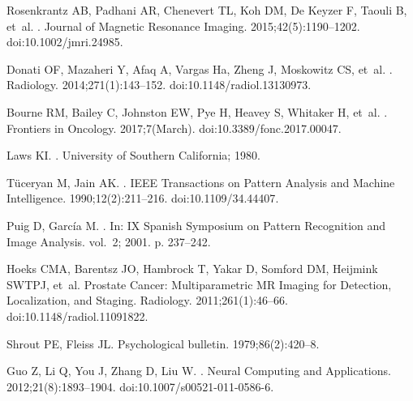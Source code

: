 \documentclass[10pt,letterpaper]{article}
\begin{document}
\begin{thebibliography}{10}
Rosenkrantz AB, Padhani AR, Chenevert TL, Koh DM, {De Keyzer} F, Taouli B,
  et~al.
.
\newblock Journal of Magnetic Resonance Imaging. 2015;42(5):1190--1202.
\newblock doi:{10.1002/jmri.24985}.

Donati OF, Mazaheri Y, Afaq A, Vargas Ha, Zheng J, Moskowitz CS, et~al.
.
\newblock Radiology. 2014;271(1):143--152.
\newblock doi:{10.1148/radiol.13130973}.

Bourne RM, Bailey C, Johnston EW, Pye H, Heavey S, Whitaker H, et~al.
.
\newblock Frontiers in Oncology. 2017;7(March).
\newblock doi:{10.3389/fonc.2017.00047}.

Laws KI.
.
\newblock University of Southern California; 1980.

T{\"{u}}ceryan M, Jain AK.
.
\newblock IEEE Transactions on Pattern Analysis and Machine Intelligence.
  1990;12(2):211--216.
\newblock doi:{10.1109/34.44407}.

Puig D, Garc{\'{i}}a M.
.
\newblock In: IX Spanish Symposium on Pattern Recognition and Image Analysis.
  vol.~2; 2001. p. 237--242.

Hoeks CMA, Barentsz JO, Hambrock T, Yakar D, Somford DM, Heijmink SWTPJ, et~al.
\newblock Prostate Cancer: Multiparametric MR Imaging for Detection,
  Localization, and Staging.
\newblock Radiology. 2011;261(1):46--66.
\newblock doi:{10.1148/radiol.11091822}.

Shrout PE, Fleiss JL.
\newblock Psychological bulletin. 1979;86(2):420--8.

Guo Z, Li Q, You J, Zhang D, Liu W.
.
\newblock Neural Computing and Applications. 2012;21(8):1893--1904.
\newblock doi:{10.1007/s00521-011-0586-6}.


\end{thebibliography}
\end{document}
